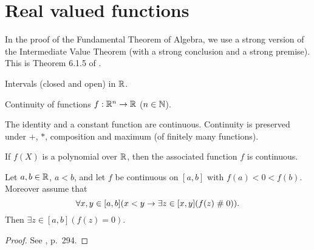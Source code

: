 \section{Real valued functions}
In the proof of the Fundamental Theorem of Algebra, we use a
strong version of the Intermediate Value Theorem (with a
strong conclusion and a strong premise). This is Theorem 6.1.5 of
\cite{TvD881}.

\begin{definition} Intervals (closed and open) in $\mathbb{R}$.
\end{definition}

\begin{definition} Continuity of functions $f:\mathbb{R}^n\rightarrow \mathbb{R}$
($n\in\mathbb{N}$).
\end{definition}

\begin{lemma}
The identity and a constant function are continuous. 
Continuity is preserved under $+$, $*$, composition and maximum
(of finitely many functions).
\end{lemma}

\begin{corollary} If $f(X)$ is a polynomial over $\mathbb{R}$, then the
associated function $f$ is continuous.
\end{corollary}

\begin{theorem}\label{thmIVT}
Let $a,b\in \mathbb{R}$, $a<b$, and let $f$ be continuous on $[a,b]$ with
$f(a)<0<f(b)$.  Moreover assume that
$$\forall x,y\in [a,b](x<y \rightarrow \exists z\in[x,y] (f(z)\mathrel{\#}
0)).$$
Then $\exists z\in[a,b](f(z)=0)$.
\end{theorem}

\begin{proof}
See \cite{TvD881}, p.\ 294.
\end{proof}


